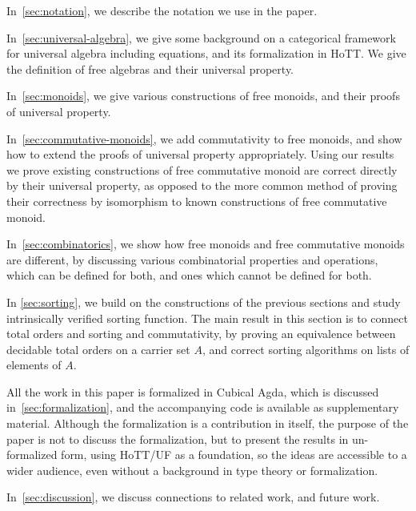 \begin{myitemize}
  \item In~\cref{sec:notation}, we describe the notation we use in the paper.
  \item In~\cref{sec:universal-algebra}, we give some background on a categorical framework for universal algebra including equations, and its formalization in HoTT. We give the definition of free algebras and their universal property.
  \item In~\cref{sec:monoids}, we give various constructions of free monoids, and their proofs of universal property.
  \item In~\cref{sec:commutative-monoids}, we add commutativity to free monoids, and show how to extend the proofs of universal property appropriately. Using our results we prove existing constructions
  of free commutative monoid are correct directly by their universal property, as opposed to
  the more common method of proving their correctness by isomorphism to known constructions
  of free commutative monoid.
  \item In~\cref{sec:combinatorics}, we show how free monoids and free commutative monoids are different, by discussing various combinatorial properties and operations, which can be defined for both, and ones which cannot be defined for both.
  \item In \cref{sec:sorting}, we build on the constructions of the previous sections and study intrinsically verified sorting function. The main result in this section is to connect total orders and sorting and commutativity, by proving an equivalence between decidable total orders on a carrier set $A$, and correct sorting algorithms on lists of elements of $A$.
  \item All the work in this paper is formalized in Cubical Agda, which is discussed in~\cref{sec:formalization}, and the accompanying code is available as supplementary material. Although the formalization is a contribution in itself, the purpose of the paper is not to discuss the formalization, but to present the results in un-formalized form, using HoTT/UF as a foundation, so the ideas are accessible to a wider audience, even without a background in type theory or formalization.
  \item In~\cref{sec:discussion}, we discuss connections to related work, and future work.
\end{myitemize}
